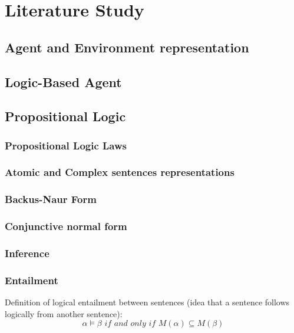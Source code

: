 \chapter{Literature Study} \label{chapter:LStudy}

\section{Agent and Environment representation}

\section{Logic-Based Agent}


\section{Propositional Logic}

\subsection{Propositional Logic Laws}

\subsection{Atomic and Complex sentences representations}



\subsection{Backus-Naur Form}


\subsection{Conjunctive normal form}


\subsection{Inference}

\subsection{Entailment}
Definition  of logical entailment between sentences (idea that a sentence follows logically from another sentence):
$$\alpha \vDash \beta \textit{ if and only if } M(\alpha) \subseteq M(\beta)$$ 


